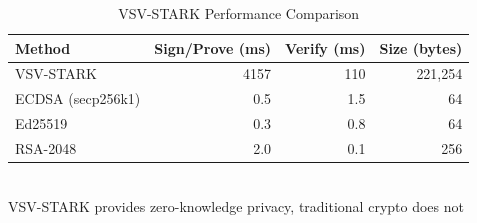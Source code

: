 
\begin{table}[t]
\centering
\caption{VSV-STARK Performance Comparison}
\label{tab:vsv_stark_performance}
\begin{tabular}{lrrr}
\toprule
\textbf{Method} & \textbf{Sign/Prove (ms)} & \textbf{Verify (ms)} & \textbf{Size (bytes)} \\
\midrule
VSV-STARK & 4157 & 110 & 221,254 \\
ECDSA (secp256k1) & 0.5 & 1.5 & 64 \\
Ed25519 & 0.3 & 0.8 & 64 \\
RSA-2048 & 2.0 & 0.1 & 256 \\
\bottomrule
\end{tabular}
\\[0.5em]
\footnotesize VSV-STARK provides zero-knowledge privacy, traditional crypto does not
\end{table}
